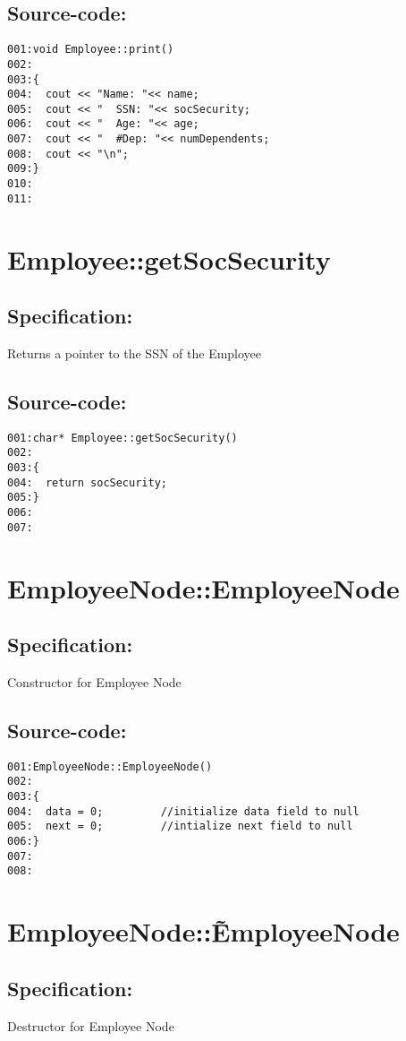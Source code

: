\subsection*{Source-code:}
\begin{verbatim}
001:void Employee::print()
002:
003:{
004:  cout << "Name: "<< name;
005:  cout << "  SSN: "<< socSecurity;
006:  cout << "  Age: "<< age;
007:  cout << "  #Dep: "<< numDependents;
008:  cout << "\n";
009:}
010:
011:
\end{verbatim}
\section{Employee::getSocSecurity}
\subsection*{Specification:}
Returns a pointer to the SSN of the Employee
\subsection*{Source-code:}
\begin{verbatim}
001:char* Employee::getSocSecurity()
002:
003:{
004:  return socSecurity;
005:}
006:
007:
\end{verbatim}
\section{EmployeeNode::EmployeeNode}
\subsection*{Specification:}
Constructor for Employee Node
\subsection*{Source-code:}
\begin{verbatim}
001:EmployeeNode::EmployeeNode()
002:     
003:{ 
004:  data = 0;         //initialize data field to null
005:  next = 0;         //intialize next field to null
006:}
007:
008:
\end{verbatim}
\section{EmployeeNode::\~EmployeeNode}
\subsection*{Specification:}
Destructor for Employee Node
